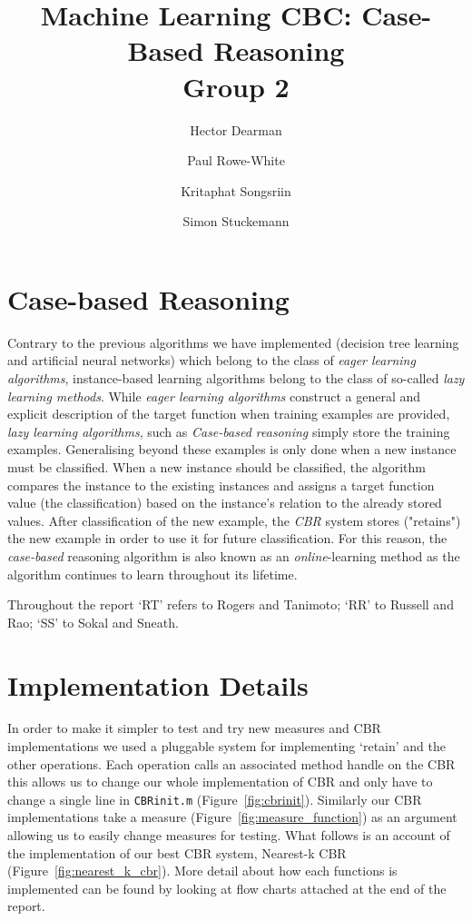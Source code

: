 \documentclass[10pt,a4paper]{article}
\author{Hector Dearman \and Paul Rowe-White \and Kritaphat Songsriin \and Simon Stuckemann}
\title{Machine Learning CBC: Case-Based Reasoning\\Group 2}
\begin{document}
\maketitle

\section{Case-based Reasoning}
Contrary to the previous algorithms we have implemented (decision tree learning and artificial neural networks) which belong to the class of \emph{eager learning algorithms}, instance-based learning algorithms belong to the class  of so-called \emph{lazy learning methods}.
While \emph{eager learning algorithms} construct a general and explicit description of the target function when training examples are provided, \emph{lazy learning algorithms}, such as \emph{Case-based reasoning} simply store the training examples. Generalising beyond these examples is only done when a new instance must be classified. When a new instance should be classified, the algorithm compares the instance to the existing instances and assigns a target function value (the classification) based on the instance's relation to the already stored values. After classification of the new example, the \emph{CBR} system stores ("retains") the new example in order to use it for future classification. For this reason, the \emph{case-based} reasoning algorithm is also known as an \emph{online}-learning method as the algorithm continues to learn throughout its lifetime.

Throughout the report `RT' refers to Rogers and Tanimoto; `RR' to Russell and Rao; `SS' to Sokal and Sneath.

\section{Implementation Details}
In order to make it simpler to test and try new measures and CBR implementations
we used a pluggable system for implementing `retain' and the other operations.
Each operation calls an associated method handle on the CBR this allows us to change our whole implementation of CBR
and only have to change a single line in {\tt CBRinit.m} (Figure~\ref{fig:cbrinit}).
Similarly our CBR implementations take a measure (Figure~\ref{fig:measure_function}) as an argument allowing us to easily change measures for testing.
What follows is an account of the implementation of our best CBR system, Nearest-k CBR (Figure~\ref{fig:nearest_k_cbr}). More detail about how each functions is implemented can be found by looking at flow charts attached at the end of the report.
\end{document}
